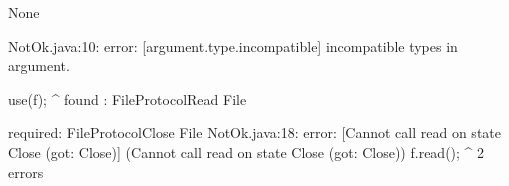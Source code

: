 \lstset{caption=Original Mungo output}
\begin{code}
None
\end{code}

\lstset{caption=New Mungo output}
\begin{code}
NotOk.java:10: error: [argument.type.incompatible] incompatible types in argument.

        use(f);
            ^
  found   : FileProtocol{Read} File

  required: FileProtocol{Close} File
NotOk.java:18: error: [Cannot call read on state Close (got: Close)] (Cannot call read on state Close (got: Close))
    f.read();
          ^
2 errors
\end{code}

